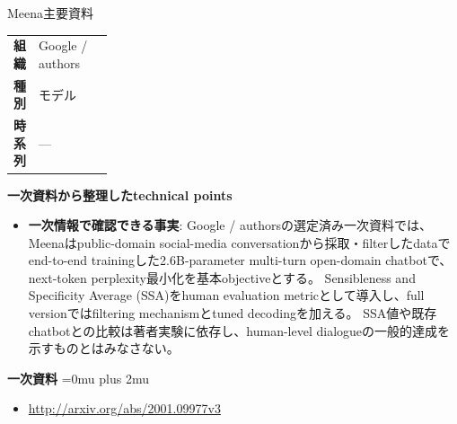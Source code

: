 \begin{technicalnote}{Meena}{主要資料}
\begingroup
\begin{tabularx}{\linewidth}{@{}>{\bfseries}p{0.22\linewidth}X@{}}
組織 & Google / authors \\
種別 & モデル \\
時系列 & — \\
\end{tabularx}
\smallskip
{\bfseries 一次資料から整理したtechnical points}
\begin{itemize}[leftmargin=1.5em,itemsep=0.35em]
\item \textbf{一次情報で確認できる事実}: Google / authorsの選定済み一次資料では、Meenaはpublic-domain social-media conversationから採取・filterしたdataでend-to-end trainingした2.6B-parameter multi-turn open-domain chatbotで、next-token perplexity最小化を基本objectiveとする。 Sensibleness and Specificity Average (SSA)をhuman evaluation metricとして導入し、full versionではfiltering mechanismとtuned decodingを加える。 SSA値や既存chatbotとの比較は著者実験に依存し、human-level dialogueの一般的達成を示すものとはみなさない。
\end{itemize}
\begin{minipage}{\linewidth}
\begin{samepage}
{\bfseries 一次資料}
\begingroup\sloppy
\Urlmuskip=0mu plus 2mu\relax
\begin{itemize}[leftmargin=1.5em,itemsep=0.25em]
\item {\scriptsize\url{http://arxiv.org/abs/2001.09977v3}}
\end{itemize}
\endgroup
\end{samepage}
\end{minipage}
\endgroup
\end{technicalnote}
\medskip

